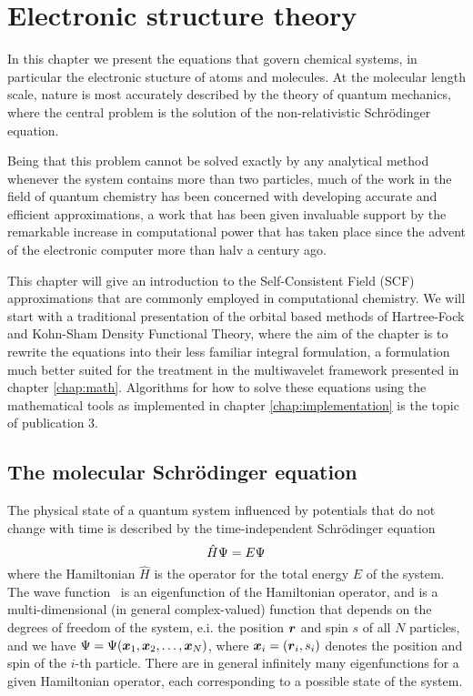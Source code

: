 \chapter{Electronic structure theory}
In this chapter we present the equations that govern chemical systems, in particular
the electronic stucture of atoms and molecules. At the molecular length scale, nature
is most accurately described by the theory of quantum mechanics, where the central
problem is the solution of the non-relativistic Schr\"{o}dinger equation.

Being that this problem cannot be solved exactly by any analytical method whenever
the system contains more than two particles, much of the work in the field of quantum
chemistry has been concerned with developing accurate and efficient approximations,
a work that has been given invaluable support by the remarkable increase in 
computational power that has taken place since the advent of the electronic computer 
more than halv a century ago.

This chapter will give an introduction to the Self-Consistent Field (SCF)
approximations that are commonly employed in computational chemistry. We will start with a
traditional presentation of the orbital based methods of Hartree-Fock and Kohn-Sham 
Density Functional Theory, where the aim of the chapter
is to rewrite the equations into their less familiar integral formulation,
a formulation much better suited for the treatment in the multiwavelet framework 
presented in chapter \ref{chap:math}. Algorithms for how to solve these equations
using the mathematical tools as implemented in chapter \ref{chap:implementation} 
is the topic of publication 3.

\section{The molecular Schr\"{o}dinger equation}\label{sec:schrodinger}
The physical state of a quantum system influenced by potentials that do not change
with time is described by the time-independent Schr\"{o}dinger equation 
\begin{equation}
    \label{eq:mol_schr}
    \hat{H}\Psi = E\Psi
\end{equation}
where the Hamiltonian $\hat{H}$ is the operator for the total energy $E$ of the system.
The wave function \Wavefunction\ is an eigenfunction of the Hamiltonian operator, 
and is a multi-dimensional (in general complex-valued) function that depends on the 
degrees of freedom of the system, e.i. the position $\boldsymbol r$ and spin $s$ of all $N$ 
particles, and we have $\Psi=\Psi(\boldsymbol x_1,\boldsymbol x_2,\dots,\boldsymbol x_N)$, 
where $\boldsymbol x_i=(\boldsymbol r_i,s_i)$ denotes the position and spin of the $i$-th particle. 
There are in general infinitely many eigenfunctions for a given Hamiltonian operator,
each corresponding to a possible state of the system. 


